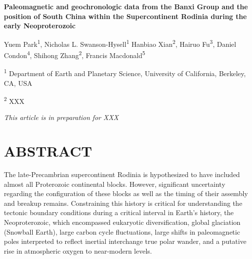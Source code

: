 \documentclass[11pt,letterpaper]{article}
\begin{document}
\begin{flushleft}
{\Large \textbf{Paleomagnetic and geochronologic data from the Banxi Group and the position of South China within the Supercontinent Rodinia during the early Neoproterozoic}}

Yuem Park\textsuperscript{1},
Nicholas L. Swanson-Hysell\textsuperscript{1}
Hanbiao Xian\textsuperscript{2},
Hairuo Fu\textsuperscript{3},
Daniel Condon\textsuperscript{4},
Shihong Zhang\textsuperscript{2},
Francis Macdonald\textsuperscript{5}

\bigskip
\textsuperscript{1} Department of Earth and Planetary Science, University of California, Berkeley, CA, USA

\textsuperscript{2} XXX
\bigskip

\end{flushleft}

\noindent\textit{This article is in preparation for XXX}

\linenumbers

\section*{ABSTRACT \label{sec:ABSTRACT}}

The late-Precambrian supercontinent Rodinia is hypothesized to have included almost all Proterozoic continental blocks. However, significant uncertainty regarding the configuration of these blocks as well as the timing of their assembly and breakup remains. Constraining this history is critical for understanding the tectonic boundary conditions during a critical interval in Earth’s history, the Neoproterozoic, which encompassed eukaryotic diversification, global glaciation (Snowball Earth), large carbon cycle fluctuations, large shifts in paleomagnetic poles interpreted to reflect inertial interchange true polar wander, and a putative rise in atmospheric oxygen to near-modern levels.
\end{document}
